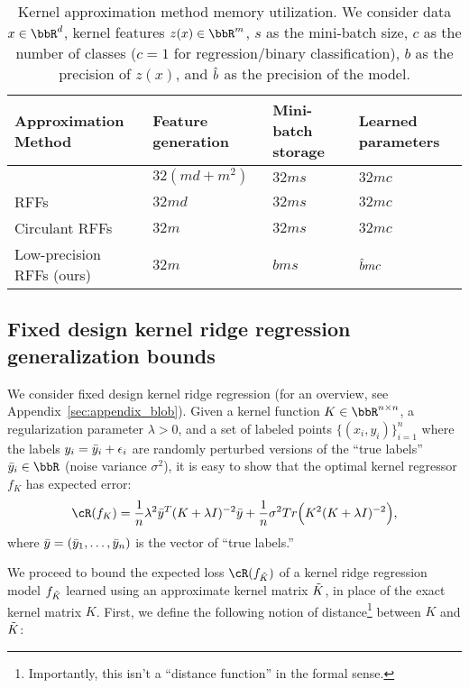 \begin{table}[h]
	\caption{Kernel approximation method memory utilization. We consider data $x\in\RR^d$, kernel features $z(x)\in\RR^m$, $s$ as the mini-batch size, $c$ as the number of classes ($c=1$ for regression/binary classification), $b$ as the precision of $z(x)$, and $\hat{b}$ as the precision of the model.}
	\label{table:mem-usage}
	\centering
	\begin{tabular}{llll}
		\toprule
		Approximation Method & Feature generation & Mini-batch storage & Learned parameters \\
		\midrule
		\Nystrom \citep{nystrom} & $32(md + m^2)$ & $32ms$ & $32mc$ \\
		RFFs \citep{rahimi07random} &  $32md$ & $32ms$ & $32mc$ \\
		Circulant RFFs \citep{yu15} & $32m$ & $32ms$ & $32mc$ \\
		Low-precision RFFs (ours)& $32m$ & $bms$ & $\hat{b} mc$ \\
		\bottomrule
	\end{tabular}
\end{table}

\subsection{Fixed design kernel ridge regression generalization bounds}
\label{sec:genbound}
We consider fixed design kernel ridge regression (for an overview, see Appendix~\ref{sec:appendix_blob}). Given a kernel function $K\in\RR^{n\times n}$, a regularization parameter $\lambda > 0$, and a set of labeled points $\{(x_i,y_i)\}_{i=1}^n$ where the labels $y_i=\bar{y}_i + \epsilon_i$ are randomly perturbed versions of the ``true labels'' $\by_i \in \RR$ (noise variance $\sigma^2$), it is easy to show \citep{alaoui15} that the optimal kernel regressor $f_K$ has expected error:
\begin{eqnarray}
\cR(f_K) = \frac{1}{n}\lambda^2 \by^T(K+\lambda I)^{-2}\by + \frac{1}{n}\sigma^2 Tr\Big(K^2(K+\lambda \id)^{-2}\Big),
\end{eqnarray}
where $\bar{y} = (\bar{y}_1,\ldots,\bar{y}_n)$ is the vector of ``true labels.''

We proceed to bound the expected loss $\cR(f_{\tK})$ of a kernel ridge regression model $f_{\tilde{K}}$ learned using an approximate kernel matrix $\tilde{K}$, in place of the exact kernel matrix $K$. First, we define the following notion of distance\footnote{Importantly, this isn't a ``distance function'' in the formal sense.} between $K$ and $\tilde{K}$:

